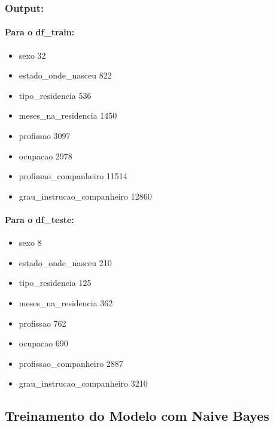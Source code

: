\documentclass[11pt]{article}
\providecommand{\tightlist}{%
      \setlength{\itemsep}{0pt}\setlength{\parskip}{0pt}}
\begin{document}
    \hypertarget{output}{%
\subsubsection{Output:}\label{output}}

\hypertarget{para-o-df_train}{%
\paragraph{Para o df\_train:}\label{para-o-df_train}}

\begin{itemize}
\tightlist
\item
  sexo 32
\item
  estado\_onde\_nasceu 822
\item
  tipo\_residencia 536
\item
  meses\_na\_residencia 1450
\item
  profissao 3097
\item
  ocupacao 2978
\item
  profissao\_companheiro 11514
\item
  grau\_instrucao\_companheiro 12860
\end{itemize}

\hypertarget{para-o-df_teste}{%
\paragraph{Para o df\_teste:}\label{para-o-df_teste}}

\begin{itemize}
\tightlist
\item
  sexo 8
\item
  estado\_onde\_nasceu 210
\item
  tipo\_residencia 125
\item
  meses\_na\_residencia 362
\item
  profissao 762
\item
  ocupacao 690
\item
  profissao\_companheiro 2887
\item
  grau\_instrucao\_companheiro 3210
\end{itemize}

    \hypertarget{treinamento-do-modelo-com-naive-bayes}{%
\subsection{Treinamento do Modelo com Naive
Bayes}\label{treinamento-do-modelo-com-naive-bayes}}
\end{document}
